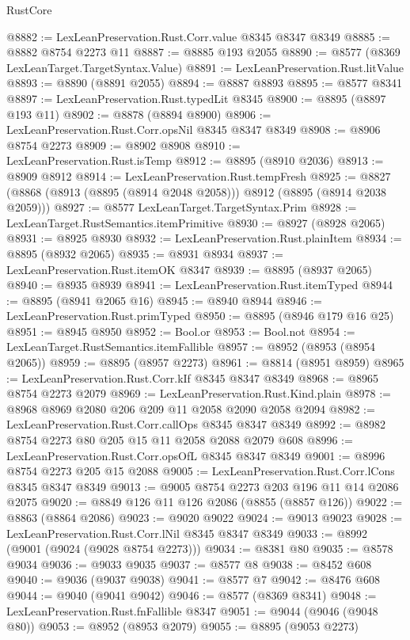 \begin{lexlean}{RustCore}
\begin{coremodule}
@8882 := LexLeanPreservation.Rust.Corr.value @8345 @8347 @8349
@8885 := @8882 @8754 @2273 @11
@8887 := @8885 @193 @2055
@8890 := @8577 (@8369 LexLeanTarget.TargetSyntax.Value)
@8891 := LexLeanPreservation.Rust.litValue
@8893 := @8890 (@8891 @2055)
@8894 := @8887 @8893
@8895 := @8577 @8341
@8897 := LexLeanPreservation.Rust.typedLit @8345
@8900 := @8895 (@8897 @193 @11)
@8902 := @8878 (@8894 @8900)
@8906 := LexLeanPreservation.Rust.Corr.opsNil @8345 @8347 @8349
@8908 := @8906 @8754 @2273
@8909 := @8902 @8908
@8910 := LexLeanPreservation.Rust.isTemp
@8912 := @8895 (@8910 @2036)
@8913 := @8909 @8912
@8914 := LexLeanPreservation.Rust.tempFresh
@8925 := @8827 (@8868 (@8913 (@8895 (@8914 @2048 @2058))) @8912 (@8895 (@8914 @2038 @2059)))
@8927 := @8577 LexLeanTarget.TargetSyntax.Prim
@8928 := LexLeanTarget.RustSemantics.itemPrimitive
@8930 := @8927 (@8928 @2065)
@8931 := @8925 @8930
@8932 := LexLeanPreservation.Rust.plainItem
@8934 := @8895 (@8932 @2065)
@8935 := @8931 @8934
@8937 := LexLeanPreservation.Rust.itemOK @8347
@8939 := @8895 (@8937 @2065)
@8940 := @8935 @8939
@8941 := LexLeanPreservation.Rust.itemTyped
@8944 := @8895 (@8941 @2065 @16)
@8945 := @8940 @8944
@8946 := LexLeanPreservation.Rust.primTyped
@8950 := @8895 (@8946 @179 @16 @25)
@8951 := @8945 @8950
@8952 := Bool.or
@8953 := Bool.not
@8954 := LexLeanTarget.RustSemantics.itemFallible
@8957 := @8952 (@8953 (@8954 @2065))
@8959 := @8895 (@8957 @2273)
@8961 := @8814 (@8951 @8959)
@8965 := LexLeanPreservation.Rust.Corr.kIf @8345 @8347 @8349
@8968 := @8965 @8754 @2273 @2079
@8969 := LexLeanPreservation.Rust.Kind.plain
@8978 := @8968 @8969 @2080 @206 @209 @11 @2058 @2090 @2058 @2094
@8982 := LexLeanPreservation.Rust.Corr.callOps @8345 @8347 @8349
@8992 := @8982 @8754 @2273 @80 @205 @15 @11 @2058 @2088 @2079 @608
@8996 := LexLeanPreservation.Rust.Corr.opsOfL @8345 @8347 @8349
@9001 := @8996 @8754 @2273 @205 @15 @2088
@9005 := LexLeanPreservation.Rust.Corr.lCons @8345 @8347 @8349
@9013 := @9005 @8754 @2273 @203 @196 @11 @14 @2086 @2075
@9020 := @8849 @126 @11 @126 @2086 (@8855 (@8857 @126))
@9022 := @8863 (@8864 @2086)
@9023 := @9020 @9022
@9024 := @9013 @9023
@9028 := LexLeanPreservation.Rust.Corr.lNil @8345 @8347 @8349
@9033 := @8992 (@9001 (@9024 (@9028 @8754 @2273)))
@9034 := @8381 @80
@9035 := @8578 @9034
@9036 := @9033 @9035
@9037 := @8577 @8
@9038 := @8452 @608
@9040 := @9036 (@9037 @9038)
@9041 := @8577 @7
@9042 := @8476 @608
@9044 := @9040 (@9041 @9042)
@9046 := @8577 (@8369 @8341)
@9048 := LexLeanPreservation.Rust.fnFallible @8347
@9051 := @9044 (@9046 (@9048 @80))
@9053 := @8952 (@8953 @2079)
@9055 := @8895 (@9053 @2273)

\end{coremodule}
\end{lexlean}
